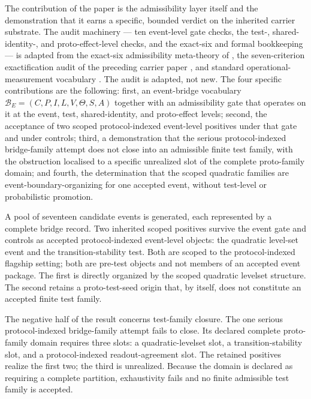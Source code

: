 \documentclass[11pt]{article}
\theoremstyle{definition}
\begin{document}
The contribution of the paper is the admissibility layer itself and the demonstration that it earns a specific, bounded verdict on the inherited carrier substrate. The audit machinery — ten event-level gate checks, the test-, shared-identity-, and proto-effect-level checks, and the exact-six and formal bookkeeping — is adapted from the exact-six admissibility meta-theory of \citet{Tsiokos2026FoundationsII}, the seven-criterion exactification audit of the preceding carrier paper \citep{Tsiokos2026CarrierExactification}, and standard operational-measurement vocabulary \citep{DaviesLewis1970}. The audit is adapted, not new. The four specific contributions are the following: first, an event-bridge vocabulary $\mathcal B_E = (C, P, I, L, V, \Theta, S, A)$ together with an admissibility gate that operates on it at the event, test, shared-identity, and proto-effect levels; second, the acceptance of two scoped protocol-indexed event-level positives under that gate and under controls; third, a demonstration that the serious protocol-indexed bridge-family attempt does not close into an admissible finite test family, with the obstruction localised to a specific unrealized slot of the complete proto-family domain; and fourth, the determination that the scoped quadratic families are event-boundary-organizing for one accepted event, without test-level or probabilistic promotion.

A pool of seventeen candidate events is generated, each represented by a complete bridge record. Two inherited scoped positives survive the event gate and controls as accepted protocol-indexed event-level objects: the quadratic level-set event and the transition-stability test. Both are scoped to the protocol-indexed flagship setting; both are pre-test objects and not members of an accepted event package. The first is directly organized by the scoped quadratic levelset structure. The second retains a proto-test-seed origin that, by itself, does not constitute an accepted finite test family.

The negative half of the result concerns test-family closure. The one serious protocol-indexed bridge-family attempt fails to close. Its declared complete proto-family domain requires three slots: a quadratic-levelset slot, a transition-stability slot, and a protocol-indexed readout-agreement slot. The retained positives realize the first two; the third is unrealized. Because the domain is declared as requiring a complete partition, exhaustivity fails and no finite admissible test family is accepted.
\end{document}
